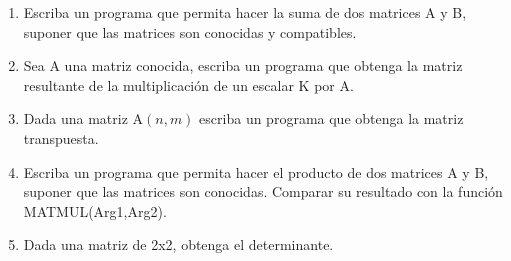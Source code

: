 \documentclass[11pt]{exam}
\begin{document}
\begin{enumerate}
\item 
Escriba un programa  que permita hacer la suma de dos matrices A y B, suponer que las matrices son conocidas y compatibles.
\item 
Sea A una matriz conocida, escriba un programa que obtenga la  matriz resultante de la multiplicaci\'on de un escalar K por A.
\item 
Dada una matriz A$(n,m)$ escriba un programa que obtenga la matriz transpuesta.
\item 
Escriba un programa  que permita hacer el producto de dos matrices A y B, suponer que las matrices son conocidas. Comparar su resultado con la funci\'on MATMUL(Arg1,Arg2).
\item 
Dada una matriz de 2x2, obtenga el determinante.


\end{enumerate}
%
\end{document}
